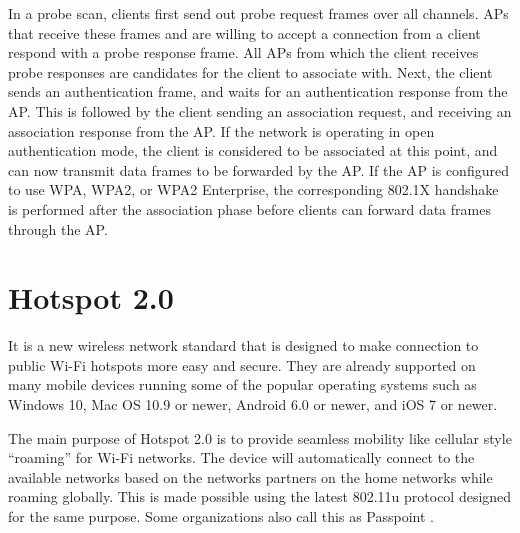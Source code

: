In a probe scan, clients first send out probe request frames over all channels. APs that receive these frames and are willing to accept a connection from a client respond with a probe response frame. All APs from which the client receives probe responses are candidates for the client to associate with. Next, the client sends an authentication frame, and waits for an authentication response from the AP. This is followed by the client sending an association request, and receiving an association response from the AP. If the network is operating in open authentication mode, the client is considered to be
associated at this point, and can now transmit data frames to be forwarded by the AP. If the AP is configured to use WPA, WPA2, or WPA2 Enterprise, the corresponding 802.1X \cite{hostapd} handshake is performed after the association phase before clients can forward data frames through the AP.


\section{Hotspot 2.0 \cite{Hotspot_2.0_Definition}} \label{Hotspot2.0}

It is a new wireless network standard that is designed to make connection to public Wi-Fi hotspots more easy and secure. They are already supported on many mobile devices running some of the popular operating systems such as Windows 10, Mac OS 10.9 or newer, Android 6.0 or newer, and iOS 7 or newer.

The main purpose of Hotspot 2.0 is to provide seamless mobility like cellular style “roaming” for Wi-Fi networks. The device will automatically connect to the available networks based on the networks partners on the home networks while roaming globally. This is made possible using the latest 802.11u \cite{IEEE802.11u} protocol designed for the same purpose. Some organizations also call this as Passpoint \cite{Passpoint}.





